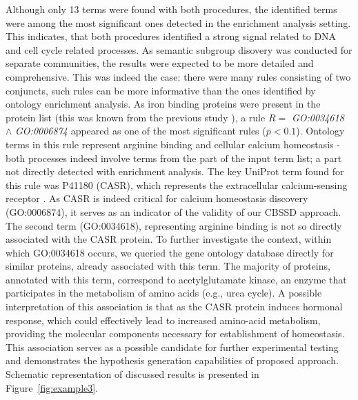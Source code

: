 \documentclass[oribibl,runningheads,a4paper]{llncs}
\begin{document}
Although only 13 terms were found with both procedures, the identified terms were among the most significant ones detected in the enrichment analysis setting. This indicates, that both procedures identified a strong signal related to DNA and cell cycle related processes. As semantic subgroup disovery was conducted for separate communities, the results were expected to be more detailed and comprehensive. This was indeed the case: there were many rules consisting of two conjuncts, such rules can be more informative than the ones identified by ontology enrichment analysis. As iron binding proteins were present in the protein list (this was known from the previous study \cite{skrlj2017}), a rule $R=$ \emph{GO:0034618} $\wedge$  \emph{GO:0006874} appeared as one of the most significant rules ($p<0.1$). Ontology terms in this rule represent arginine binding and cellular calcium homeostasis - both processes indeed involve terms from the part of the input term list; a part not directly detected with enrichment analysis. The key UniProt term found for this rule was P41180 (CASR), which represents the extracellular calcium-sensing receptor \cite{garrett1995molecular}. As CASR is indeed critical for calcium homeostasis discovery (GO:0006874), it serves as an indicator of the validity of our CBSSD approach. The second term (GO:0034618), representing arginine binding is not so directly associated with the CASR protein. To further investigate the context, within which GO:0034618 occurs, we queried the gene ontology database directly for similar proteins, already associated with this term. The majority of proteins, annotated with this term, correspond to acetylglutamate kinase, an enzyme that participates in the metabolism of amino acids (e.g., urea cycle). A possible interpretation of this association is that as the CASR protein induces hormonal response, which could effectively lead to increased amino-acid metabolism, providing the molecular components necessary for establishment of homeostasis. This association serves as a possible candidate for further experimental testing and demonstrates the hypothesis generation capabilities of proposed approach. Schematic representation of discussed results is presented in Figure~\ref{fig:example3}.\\
\end{document}
